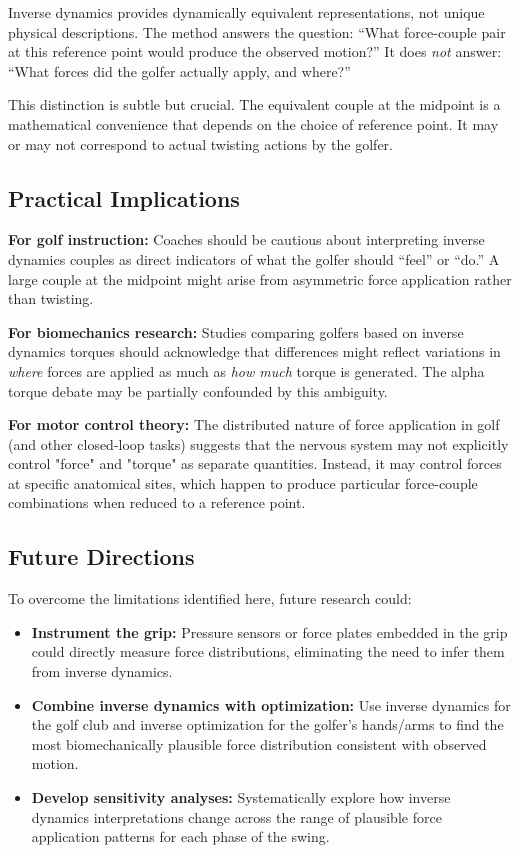 \documentclass[11pt,a4paper]{article}
\begin{document}
Inverse dynamics provides dynamically equivalent representations, not unique physical descriptions. The method answers the question: ``What force-couple pair at this reference point would produce the observed motion?'' It does \emph{not} answer: ``What forces did the golfer actually apply, and where?''

This distinction is subtle but crucial. The equivalent couple at the midpoint is a mathematical convenience that depends on the choice of reference point. It may or may not correspond to actual twisting actions by the golfer.

\subsection{Practical Implications}

\textbf{For golf instruction:} Coaches should be cautious about interpreting inverse dynamics couples as direct indicators of what the golfer should ``feel'' or ``do.'' A large couple at the midpoint might arise from asymmetric force application rather than twisting.

\textbf{For biomechanics research:} Studies comparing golfers based on inverse dynamics torques should acknowledge that differences might reflect variations in \emph{where} forces are applied as much as \emph{how much} torque is generated. The alpha torque debate may be partially confounded by this ambiguity.

\textbf{For motor control theory:} The distributed nature of force application in golf (and other closed-loop tasks) suggests that the nervous system may not explicitly control "force" and "torque" as separate quantities. Instead, it may control forces at specific anatomical sites, which happen to produce particular force-couple combinations when reduced to a reference point.

\subsection{Future Directions}

To overcome the limitations identified here, future research could:

\begin{itemize}
    \item \textbf{Instrument the grip:} Pressure sensors or force plates embedded in the grip could directly measure force distributions, eliminating the need to infer them from inverse dynamics.
    
    \item \textbf{Combine inverse dynamics with optimization:} Use inverse dynamics for the golf club and inverse optimization for the golfer's hands/arms to find the most biomechanically plausible force distribution consistent with observed motion.
    
    \item \textbf{Develop sensitivity analyses:} Systematically explore how inverse dynamics interpretations change across the range of plausible force application patterns for each phase of the swing.
\end{itemize}
\end{document}
